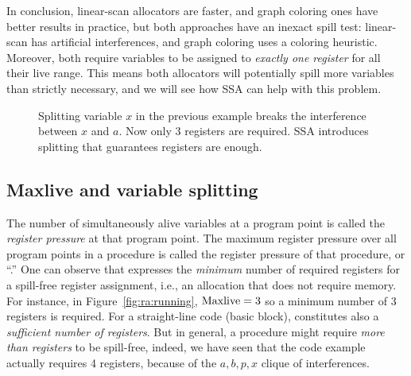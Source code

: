 {\medskip

In conclusion, linear-scan allocators are faster, and graph coloring ones have better results in practice, but both approaches have an inexact spill test: linear-scan has artificial interferences, and graph coloring uses a coloring heuristic.
Moreover, both require variables to be assigned to \emph{exactly one register} for all their live range.
This means both allocators will potentially spill more variables than strictly necessary, and we will see how SSA can help with this problem.


\begin{figure}
  \begin{center}
  \end{center}
  \caption{Splitting variable $x$ in the previous example breaks the 
    interference between $x$ and $a$. Now only 3 registers are required.
    SSA introduces splitting that guarantees \maxlive registers are enough.
  }
  \label{fig:ra:running-split-SSA}
\end{figure}



\subsection{Maxlive and variable splitting}




The number of simultaneously alive variables at a program point is called the \emph{register pressure} at that program point.
%
The maximum register pressure over all program points in a procedure is called the register pressure of that procedure, or ``\maxlive.'' 
One can observe that \maxlive expresses the \emph{minimum} number of required registers for a spill-free register assignment, i.e., an allocation that does not require memory.
For instance, in Figure~\ref{fig:ra:running}, $\mathrm{Maxlive} = 3$ so a minimum number of 3 registers is required.
For a straight-line code (basic block), \maxlive constitutes also a \emph{sufficient number of registers}.
But in general, a procedure might require \emph{more than \maxlive registers} to be spill-free, indeed, we have seen that the code example actually requires 4 registers, because of the $a,b,p,x$ clique of interferences.




}
